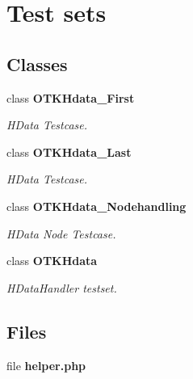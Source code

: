 \section{Test sets}
\label{group__OTK__TESTSETS}
\subsection*{Classes}
\begin{DoxyCompactItemize}
\item 
class {\bf OTKHdata\_\-First}
\begin{DoxyCompactList}\small\item\em HData Testcase. \end{DoxyCompactList}\item 
class {\bf OTKHdata\_\-Last}
\begin{DoxyCompactList}\small\item\em HData Testcase. \end{DoxyCompactList}\item 
class {\bf OTKHdata\_\-Nodehandling}
\begin{DoxyCompactList}\small\item\em HData Node Testcase. \end{DoxyCompactList}\item 
class {\bf OTKHdata}
\begin{DoxyCompactList}\small\item\em HDataHandler testset. \end{DoxyCompactList}\end{DoxyCompactItemize}
\subsection*{Files}
\begin{DoxyCompactItemize}
\item 
file {\bf helper.php}
\end{DoxyCompactItemize}
